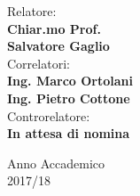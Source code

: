 \documentclass[12pt, oneside]{book}
\let\cleardoublepage\clearpage  %
\theoremstyle{definition}
\theoremstyle{plain}
\begin{document}
\begin{titlepage}
\begin{minipage}[t]{0.70\textwidth}
{}
\end{minipage}
\begin{minipage}[t]{0.47\textwidth}\raggedright
{\large Relatore:\\
\vspace{3mm}
\textbf{Chiar.mo Prof.}\\ \textbf{Salvatore Gaglio}\\
\vspace{5mm}
Correlatori:\\
\vspace{3mm}
\textbf{Ing. Marco Ortolani}\\
\vspace{3mm}
\textbf{Ing. Pietro Cottone}\\
\vspace{5mm}
Controrelatore:\\
\vspace{3mm}
\textbf {In attesa di nomina}\\
}
\end{minipage}
\hfill
\vspace{7mm}
\begin{center}
{\large Anno Accademico\\2017/18 }%
\end{center}
\end{titlepage}


\frontmatter %

\cleardoublepage
{}
{}


\tableofcontents
\listoffigures
\listoftables




\end{document}
